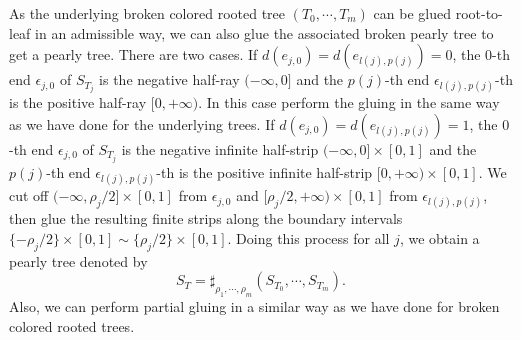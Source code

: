 \documentclass{amsart}
\numberwithin{equation}{section}
\numberwithin{figure}{section}
\begin{document}
	As the underlying broken colored rooted tree $(T_{0}, \cdots, T_{m})$ can be glued root-to-leaf in an admissible way, we can also glue the associated broken pearly tree to get a pearly tree. There are two cases. If $d(e_{j, 0}) = d(e_{l(j), p(j)}) = 0$, the $0$-th end $\epsilon_{j, 0}$ of $S_{T_{j}}$ is the negative half-ray $(-\infty, 0]$ and the $p(j)$-th end $\epsilon_{l(j), p(j)}$-th is the positive half-ray $[0, +\infty)$. In this case perform the gluing in the same way as we have done for the underlying trees. If $d(e_{j, 0}) = d(e_{l(j), p(j)}) = 1$, the $0$-th end $\epsilon_{j, 0}$ of $S_{T_{j}}$ is the negative infinite half-strip $(-\infty, 0] \times [0, 1]$ and the $p(j)$-th end $\epsilon_{l(j), p(j)}$-th is the positive infinite half-strip $[0, +\infty) \times [0, 1]$. We cut off $(-\infty, \rho_{j}/2] \times [0, 1]$ from $\epsilon_{j, 0}$ and $[\rho_{j}/2, +\infty) \times [0, 1]$ from $\epsilon_{l(j), p(j)}$, then glue the resulting finite strips along the boundary intervals $\{-\rho_{j}/2\} \times [0, 1] \sim \{\rho_{j}/2\} \times [0, 1]$. Doing this process for all $j$, we obtain a pearly tree denoted by
\begin{equation}
S_{T} = \sharp_{\rho_{1}, \cdots, \rho_{m}}(S_{T_{0}}, \cdots, S_{T_{m}}).
\end{equation}
Also, we can perform partial gluing in a similar way as we have done for broken colored rooted trees. \par
\end{document}

